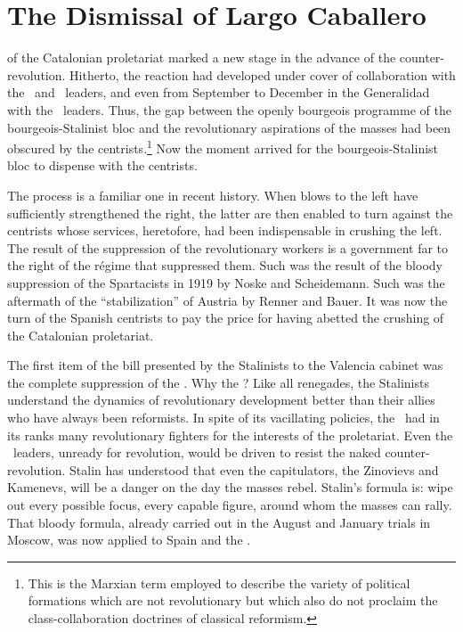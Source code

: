 \chapter{The Dismissal of Largo Caballero}

 of the Catalonian proletariat marked a new stage in the advance of the counter-revolution. Hitherto, the reaction had developed under cover of collaboration with the \CNT\ and \UGT\ leaders, and even from September to December in the Generalidad with the \POUM\ leaders. Thus, the gap between the openly bourgeois programme of the bourgeois-Stalinist bloc and the revolutionary aspirations of the masses had been obscured by the centrists.\footnote{This is the Marxian term employed to describe the variety of political formations which are not revolutionary but which also do not proclaim the class-collaboration doctrines of classical reformism.} Now the moment arrived for the bourgeois-Stalinist bloc to dispense with the centrists.

The process is a familiar one in recent history. When blows to the left have sufficiently strengthened the right, the latter are then enabled to turn against the centrists whose services, heretofore, had been indispensable in crushing the left. The result of the suppression of the revolutionary workers is a government far to the right of the régime that suppressed them. Such was the result of the bloody suppression of the Spartacists in 1919 by Noske and Scheidemann. Such was the aftermath of the ``stabilization'' of Austria by Renner and Bauer. It was now the turn of the Spanish centrists to pay the price for having abetted the crushing of the Catalonian proletariat.

The first item of the bill presented by the Stalinists to the Valencia cabinet was the complete suppression of the \POUM. Why the \POUM? Like all renegades, the Stalinists understand the dynamics of revolutionary development better than their allies who have always been reformists. In spite of its vacillating policies, the \POUM\ had in its ranks many revolutionary fighters for the interests of the proletariat. Even the \POUM\ leaders, unready for revolution, would be driven to resist the naked counter-revolution. Stalin has understood that even the capitulators, the Zinovievs and Kamenevs, will be a danger on the day the masses rebel. Stalin’s formula is: wipe out every possible focus, every capable figure, around whom the masses can rally. That bloody formula, already carried out in the August and January trials in Moscow, was now applied to Spain and the \POUM.

